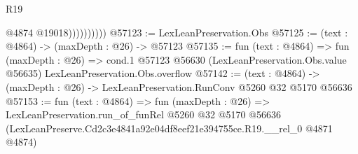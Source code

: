 \begin{lexlean}{R19}
\begin{coremodule}
                        @4874
                        @19018))))))))))
@57123 := LexLeanPreservation.Obs
@57125 := (text : @4864) -> (maxDepth : @26) -> @57123
@57135 := fun (text : @4864) =>
  fun (maxDepth : @26) =>
  cond.{1} @57123 @56630 (LexLeanPreservation.Obs.value @56635) LexLeanPreservation.Obs.overflow
@57142 := (text : @4864) -> (maxDepth : @26) -> LexLeanPreservation.RunConv @5260 @32 @5170 @56636
@57153 := fun (text : @4864) =>
  fun (maxDepth : @26) =>
  LexLeanPreservation.run_of_funRel
    @5260
    @32
    @5170
    @56636
    (LexLeanPreserve.Cd2c3e4841a92e04df8eef21e394755ce.R19.__rel_0 @4871 @4874)
\end{coremodule}
\end{lexlean}
